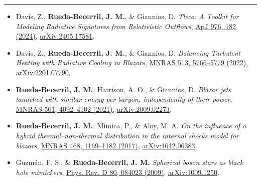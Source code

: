 \documentclass[10pt,letterpaper]{article}
\newcommand{\cvsection}[1]{%
  \vspace{5pt}{\large\bfseries #1}\par\nopagebreak\vspace{2pt}\hrule
  \nopagebreak\vspace{3pt}\nopagebreak}
\begin{document}
\cvsection{Selected Publications (9 published articles, 3 first-author; 3 in preparation)}
\begin{itemize}
  \item{} Davis, Z., \textbf{Rueda-Becerril, J. M.}, \& Giannios, D. \textit{Tleco: A Toolkit for Modeling Radiative Signatures from Relativistic Outflows}, \href{https://doi.org/10.3847/1538-4357/ad8bc2}{ApJ 976, 182 (2024)}, \href{https://arxiv.org/abs/2405.17581}{arXiv:2405.17581}.
  \item{} Davis, Z., \textbf{Rueda-Becerril, J. M.}, \& Giannios, D. \textit{Balancing Turbulent Heating with Radiative Cooling in Blazars}, \href{https://doi.org/10.1093/mnras/stac1282}{MNRAS 513, 5766–5779 (2022)}, \href{https://arxiv.org/abs/2201.07790}{arXiv:2201.07790}.
  \item{} \textbf{Rueda-Becerril, J. M.}, Harrison, A. O., \& Giannios, D. \textit{Blazar jets launched with similar energy per baryon, independently of their power}, \href{https://doi.org/10.1093/mnras/staa3925}{MNRAS 501, 4092–4102 (2021)}, \href{https://arxiv.org/abs/2009.02273}{arXiv:2009.02273}.
  \item{} \textbf{Rueda-Becerril, J. M.}, Mimica, P., \& Aloy, M. A. \textit{On the influence of a hybrid thermal–non-thermal distribution in the internal shocks model for blazars}, \href{https://doi.org/10.1093/mnras/stx476}{MNRAS 468, 1169–1182 (2017)}, \href{https://arxiv.org/abs/1612.06383}{arXiv:1612.06383}.
  \item{} Guzmán, F. S., \& \textbf{Rueda-Becerril, J. M.} \textit{Spherical boson stars as black hole mimickers}, \href{https://doi.org/10.1103/PhysRevD.80.084023}{Phys. Rev. D 80, 084023 (2009)}, \href{https://arxiv.org/abs/1009.1250}{arXiv:1009.1250}.
\end{itemize}
\end{document}
